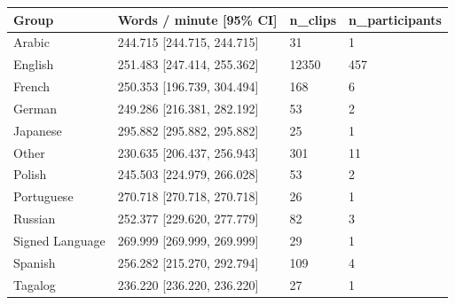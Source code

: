 \begin{tabular}{llll}
\toprule
Group & Words / minute [95\% CI] & n\_clips & n\_participants \\
\midrule
Arabic & 244.715 [244.715, 244.715] & 31 & 1 \\
English & 251.483 [247.414, 255.362] & 12350 & 457 \\
French & 250.353 [196.739, 304.494] & 168 & 6 \\
German & 249.286 [216.381, 282.192] & 53 & 2 \\
Japanese & 295.882 [295.882, 295.882] & 25 & 1 \\
Other & 230.635 [206.437, 256.943] & 301 & 11 \\
Polish & 245.503 [224.979, 266.028] & 53 & 2 \\
Portuguese & 270.718 [270.718, 270.718] & 26 & 1 \\
Russian & 252.377 [229.620, 277.779] & 82 & 3 \\
Signed Language & 269.999 [269.999, 269.999] & 29 & 1 \\
Spanish & 256.282 [215.270, 292.794] & 109 & 4 \\
Tagalog & 236.220 [236.220, 236.220] & 27 & 1 \\
\bottomrule
\end{tabular}
